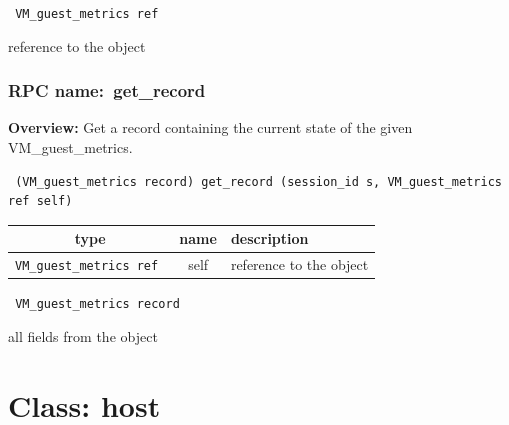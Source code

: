 \vspace{0.3cm}

{\tt 
VM\_guest\_metrics ref
}


reference to the object
\vspace{0.3cm}
\vspace{0.3cm}
\vspace{0.3cm}
\subsubsection{RPC name:~get\_record}

{\bf Overview:} 
Get a record containing the current state of the given VM\_guest\_metrics.

\begin{verbatim} (VM_guest_metrics record) get_record (session_id s, VM_guest_metrics ref self)\end{verbatim}



 
\vspace{0.3cm}
\begin{tabular}{|c|c|p{7cm}|}
 \hline
{\bf type} & {\bf name} & {\bf description} \\ \hline
{\tt VM\_guest\_metrics ref } & self & reference to the object \\ \hline 

\end{tabular}

\vspace{0.3cm}

{\tt 
VM\_guest\_metrics record
}


all fields from the object
\vspace{0.3cm}
\vspace{0.3cm}
\vspace{0.3cm}

\vspace{1cm}
\newpage
\section{Class: host}
